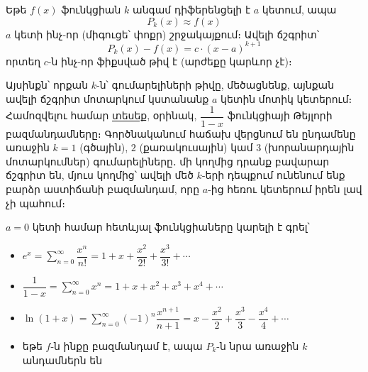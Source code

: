 \begin{theorem}
Եթե $f(x)$ ֆունկցիան $k$ անգամ դիֆերենցելի է $a$ կետում, ապա
\[
P_k(x) \approx f(x)
\]
$a$ կետի ինչ-որ (միգուցե՝ փոքր) շրջակայքում։ Ավելի ճշգրիտ՝
\[
P_k(x) - f(x) = c \cdot (x-a)^{k+1}
\]
որտեղ $c$-ն ինչ-որ ֆիքսված թիվ է (արժեքը կարևոր չէ)։
\end{theorem}


Այսինքն՝ որքան $k$-ն՝ գումարելիների թիվը, մեծացնենք, այնքան ավելի ճշգրիտ մոտարկում կստանանք $a$ կետին մոտիկ կետերում։ Համոզվելու համար \href{https://math.libretexts.org/Learning_Objects/Interactive_Calculus_Activities/Power_Series_1_Over_1-x}{տեսեք}, օրինակ, $\dfrac{1}{1-x}$ ֆունկցիայի Թեյլորի բազմանդամները։ Գործնականում հաճախ վերցնում են ընդամենը առաջին $k=1$ (գծա\-յին), $2$ (քառակուսային) կամ $3$ (խորանարդային մոտարկումներ) գումա\-րե\-լի\-ները․ մի կողմից դրանք բավարար ճշգրիտ են, մյուս կողմից՝ ավելի մեծ $k$-երի դեպքում ունենում ենք բարձր աստիճանի բազմանդամ, որը $a$-ից հեռու կետերում իրեն լավ չի պահում։


\begin{example}
$a=0$ կետի համար հետևյալ ֆունկցիաները կարելի է գրել՝
\begin{itemize}
\item $\displaystyle e^x = \sum_{n=0}^{\infty} \dfrac{x^n}{n!} = 1 + x + \dfrac{x^2}{2!} + \dfrac{x^3}{3!} + \cdots$

\item $\displaystyle \dfrac{1}{1-x}= \sum_{n=0}^\infty x^n = 1+x+x^2+x^3+x^4+\cdots $

\item $\displaystyle\ln(1+x)=\sum_{n=0}^\infty(-1)^n\dfrac{x^{n+1}}{n+1}=x -
\dfrac{x^2}{2} + \dfrac{x^3}{3} - \dfrac{x^4}{4}+ \cdots$

\item եթե $f$-ն ինքը բազմանդամ է, ապա $P_k$-ն նրա առաջին $k$ անդամներն են
\end{itemize} 
\end{example}

